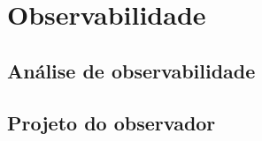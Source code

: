 \section{Observabilidade}

\subsection{Análise de observabilidade}

\subsection{Projeto do observador}
